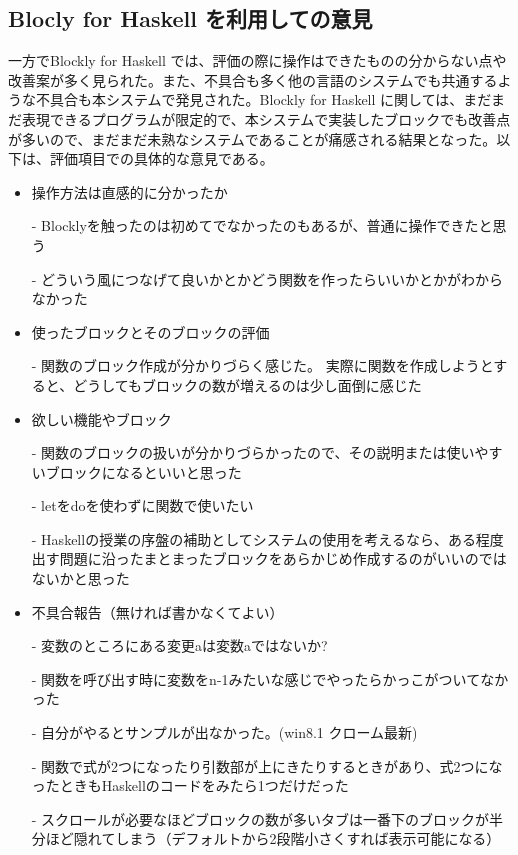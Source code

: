 \documentclass{eniepaper}
\begin{document}
   \subsection{Blocly for Haskell を利用しての意見}
   
一方でBlockly for Haskell では、評価の際に操作はできたものの分からない点や改善案が多く見られた。また、不具合も多く他の言語のシステムでも共通するような不具合も本システムで発見された。Blockly for Haskell に関しては、まだまだ表現できるプログラムが限定的で、本システムで実装したブロックでも改善点が多いので、まだまだ未熟なシステムであることが痛感される結果となった。以下は、評価項目での具体的な意見である。
   
\begin{itemize}
\item 操作方法は直感的に分かったか

- Blocklyを触ったのは初めてでなかったのもあるが、普通に操作できたと思う

- どういう風につなげて良いかとかどう関数を作ったらいいかとかがわからなかった

\item 使ったブロックとそのブロックの評価

- 関数のブロック作成が分かりづらく感じた。
実際に関数を作成しようとすると、どうしてもブロックの数が増えるのは少し面倒に感じた

\item 欲しい機能やブロック

- 関数のブロックの扱いが分かりづらかったので、その説明または使いやすいブロックになるといいと思った

- letをdoを使わずに関数で使いたい

- Haskellの授業の序盤の補助としてシステムの使用を考えるなら、ある程度出す問題に沿ったまとまったブロックをあらかじめ作成するのがいいのではないかと思った

\item 不具合報告（無ければ書かなくてよい）

- 変数のところにある変更aは変数aではないか?

- 関数を呼び出す時に変数をn-1みたいな感じでやったらかっこがついてなかった

- 自分がやるとサンプルが出なかった。(win8.1 クローム最新)

- 関数で式が2つになったり引数部が上にきたりするときがあり、式2つになったときもHaskellのコードをみたら1つだけだった

- スクロールが必要なほどブロックの数が多いタブは一番下のブロックが半分ほど隠れてしまう（デフォルトから2段階小さくすれば表示可能になる）

\end{itemize}
\end{document}
